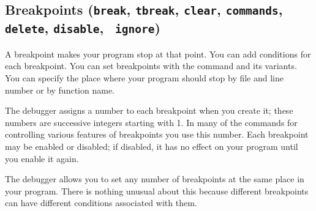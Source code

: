 \subsection{Breakpoints ({\tt break}, {\tt tbreak}, {\tt clear},
  {\tt commands}, {\tt delete}, {\tt disable}, {\tt
  ignore})\label{subsubsection-brkpts}}

 A breakpoint makes your program stop at that
point. You can add conditions for each breakpoint.  You can set
breakpoints with the  command and its variants. You can specify
the place where your program should stop by file and line number or by
function name.

The debugger assigns a number to each breakpoint when you create it;
these numbers are successive integers starting with 1.  In many of the
commands for controlling various features of breakpoints you use this
number.  Each breakpoint may be enabled or disabled; if disabled, it
has no effect on your program until you enable it again.

The debugger allows you to set any number of breakpoints at the same
place in your program.  There is nothing unusual about this because
different breakpoints can have different conditions associated with them.

